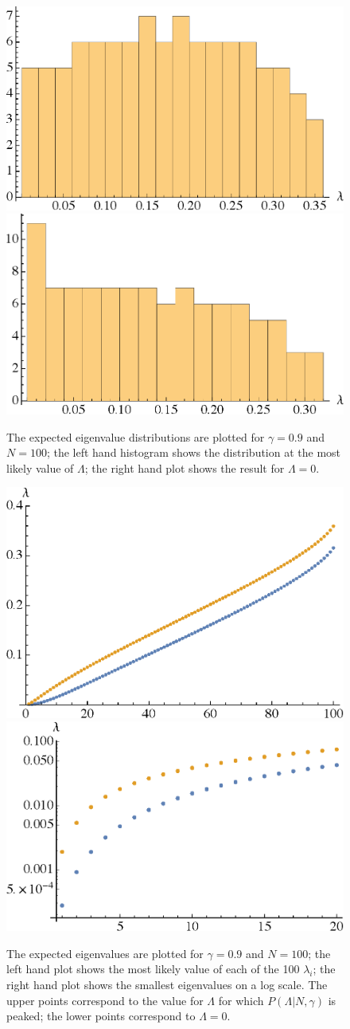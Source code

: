 \documentclass[12pt]{article}
\begin{document}
\begin{figure} 
  \centering
  \includegraphics[width=.45\linewidth]{h1_100.eps} \hfill \includegraphics[width=.45\linewidth]{h2_100.eps}
  \caption{The expected eigenvalue distributions are plotted for $\gamma=0.9$ and $N=100$; the left hand histogram shows the distribution at the most likely value of $\Lambda$; the right hand plot shows the result for $\Lambda=0$.}
  \label{eigendist}
\end{figure}

\begin{figure} 
  \centering
  \includegraphics[width=.45\linewidth]{l1_100.eps} \hfill \includegraphics[width=.45\linewidth]{l2_100.eps}
  \caption{The expected eigenvalues are plotted for $\gamma=0.9$ and $N=100$; the left hand plot shows the most likely value of each of the 100 $\lambda_i$; the right hand plot shows the smallest eigenvalues on a log scale. The upper points correspond to the value for $\Lambda$ for which $P(\Lambda| N,\gamma)$  is peaked; the lower points correspond to $\Lambda=0$. }
  \label{eigendist}
\end{figure}
\end{document}
